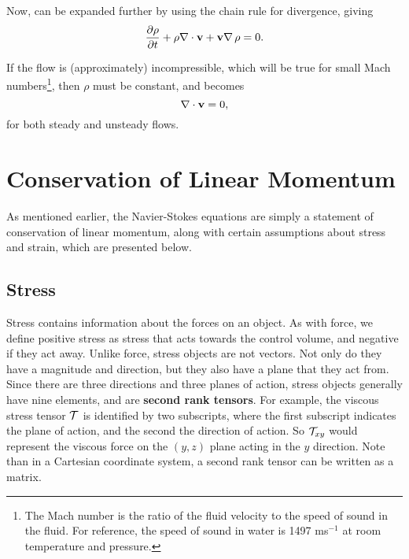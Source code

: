 Now,  can be expanded further by using the chain rule for divergence, giving
\begin{equation}\label{eq:expandedMass}
\pder{1}{\rho}{t} + \rho\Div{\Vector{v}} + \Vector{v}\Grad{\rho}=0.
\end{equation}

If the flow is (approximately) incompressible, which will be true for small Mach numbers\footnote{The Mach number is the ratio of the fluid velocity to the speed of sound in the fluid. For reference, the speed of sound in water is 1497 ms$^{-1}$ at room temperature and pressure.}, then $\rho$ must be constant, and  becomes 
\begin{equation}\label{eq:consMassIncomp}
\nabla\cdot\mathbf{v} = 0,
\end{equation}
for both steady and unsteady flows.

\section{Conservation of Linear Momentum} 

As mentioned earlier, the Navier-Stokes equations are simply a statement of conservation of linear momentum, along with certain assumptions about stress  and strain, which are presented below. 
\subsection{Stress}

Stress contains information about the forces on an object. As with force, we define positive stress as stress that acts towards the control volume, and negative if they act away. Unlike force, stress objects are not vectors. Not only do they have a magnitude and direction, but they also have a plane that they act from. Since there are three directions and three planes of action, stress objects generally have nine elements, and are {\bf second rank tensors}. For example, the viscous stress tensor $\mathcal{T}$ is identified by two subscripts, where the first subscript indicates the plane of action, and the second the direction of action. So $\mathcal{T}_{xy}$ would represent the viscous force on the $(y,z)$ plane acting in the $y$ direction. Note than in a Cartesian coordinate system, a second rank tensor can be written as a matrix. 

